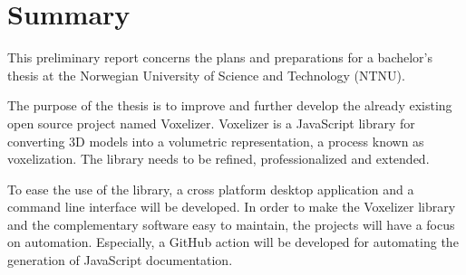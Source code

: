 \section*{Summary}

This preliminary report concerns the plans and preparations for a bachelor's thesis at the Norwegian University of Science and Technology (NTNU).

The purpose of the thesis is to improve and further develop the already existing open source project named Voxelizer. Voxelizer is a JavaScript library for converting 3D models into a volumetric representation, a process known as voxelization. The library needs to be refined, professionalized and extended.

To ease the use of the library, a cross platform desktop application and a command line interface will be developed. In order to make the Voxelizer library and the complementary software easy to maintain, the projects will have a focus on automation. Especially, a GitHub action will be developed for automating the generation of JavaScript documentation.

